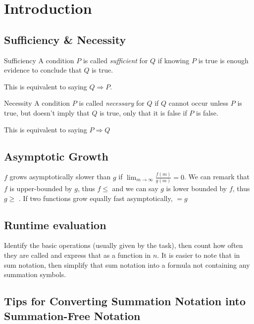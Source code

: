 \newsection
\section{Introduction}

\subsection{Sufficiency \& Necessity}
\begin{definition}[]{Sufficiency}
    A condition $P$ is called \textit{sufficient} for $Q$ if knowing $P$ is true is enough evidence to conclude that $Q$ is true.

    This is equivalent to saying $Q \Rightarrow P$.
\end{definition}

\begin{definition}[]{Necessity}
    A condition $P$ is called \textit{necessary} for $Q$ if $Q$ cannot occur unless $P$ is true, but doesn't imply that $Q$ is true, only that it is false if $P$ is false.

    This is equivalent to saying $P \Rightarrow Q$
\end{definition}

\subsection{Asymptotic Growth}
$f$ grows asymptotically slower than $g$ if $\displaystyle\lim_{m \rightarrow \infty} \frac{f(m)}{g(m)} = 0$.
We can remark that $f$ is upper-bounded by $g$, thus $f \leq$ and we can say $g$ is lower bounded by $f$, thus $g \geq$ .
If two functions grow equally fast asymptotically,  $= g$


\subsection{Runtime evaluation}
Identify the basic operations (usually given by the task), then count how often they are called and express that as a function in $n$.
It is easier to note that in sum notation, then simplify that sum notation into a formula not containing any summation symbols.


\subsection{Tips for Converting Summation Notation into Summation-Free Notation}

